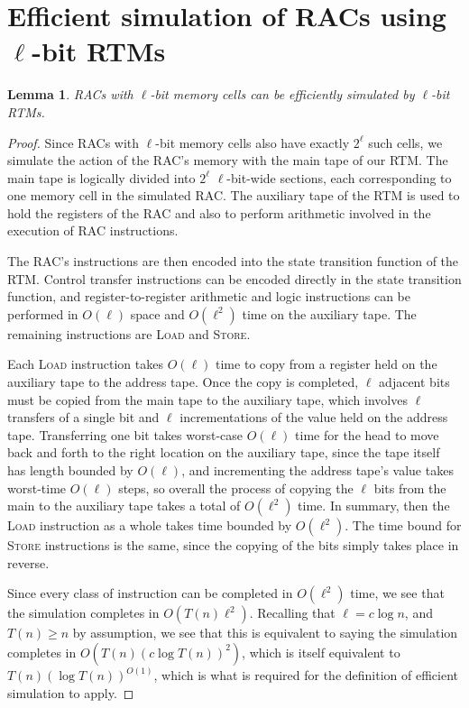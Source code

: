 \documentclass[english]{article}
\theoremstyle{plain}
\theoremstyle{definition}
\theoremstyle{plain}
\newtheorem{lem}[thm]{Lemma}
\begin{document}
\section{Efficient simulation of RACs using $\ell$-bit RTMs}

\begin{lem}
  RACs with $\ell$-bit memory cells can be efficiently simulated by
  $\ell$-bit RTMs.
\end{lem}

\begin{proof}
  Since RACs with $\ell$-bit memory cells also have exactly $2^\ell$
  such cells, we simulate the action of the RAC's memory with the main
  tape of our RTM. The main tape is logically divided into $2^\ell$
  $\ell$-bit-wide sections, each corresponding to one memory cell in
  the simulated RAC. The auxiliary tape of the RTM is used to hold the
  registers of the RAC and also to perform arithmetic involved in the
  execution of RAC instructions.

  The RAC's instructions are then encoded into the state transition
  function of the RTM. Control transfer instructions can be encoded
  directly in the state transition function, and register-to-register
  arithmetic and logic instructions can be performed in $O(\ell)$
  space and $O(\ell^2)$ time on the auxiliary tape. The remaining
  instructions are \textsc{Load} and \textsc{Store}.

  Each \textsc{Load} instruction takes $O(\ell)$ time to copy from a
  register held on the auxiliary tape to the address tape. Once the
  copy is completed, $\ell$ adjacent bits must be copied from the main
  tape to the auxiliary tape, which involves $\ell$ transfers of a
  single bit and $\ell$ incrementations of the value held on the
  address tape. Transferring one bit takes worst-case $O(\ell)$ time
  for the head to move back and forth to the right location on the
  auxiliary tape, since the tape itself has length bounded by
  $O(\ell)$, and incrementing the address tape's value takes
  worst-time $O(\ell)$ steps, so overall the process of copying the
  $\ell$ bits from the main to the auxiliary tape takes a total of
  $O(\ell^2)$ time. In summary, then the \textsc{Load} instruction as
  a whole takes time bounded by $O(\ell^2)$. The time bound for
  \textsc{Store} instructions is the same, since the copying of the
  bits simply takes place in reverse.

  Since every class of instruction can be completed in $O(\ell^2)$
  time, we see that the simulation completes in $O(T(n)
  \ell^2)$. Recalling that $\ell=c \log n$, and $T(n) \geq n$ by
  assumption, we see that this is equivalent to saying the simulation
  completes in $O(T(n) (c \log T(n))^2)$, which is itself equivalent
  to $T(n)(\log T(n))^{O(1)}$, which is what is required for the
  definition of efficient simulation to apply.
\end{proof}
\end{document}
